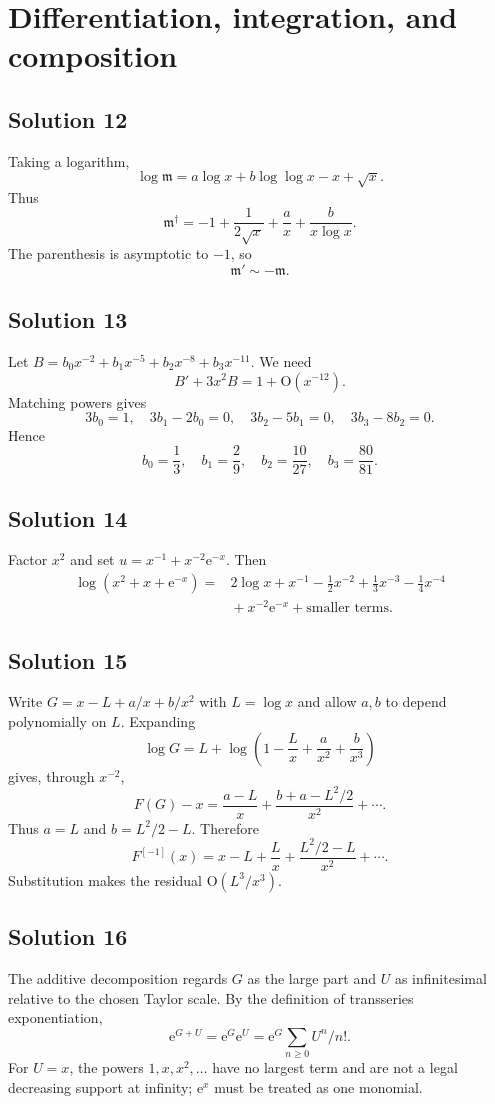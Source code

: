 \documentclass[11pt,openany]{book}
\theoremstyle{plain}
\theoremstyle{definition}
\theoremstyle{remark}
\newcommand{\m}{\mathfrak{m}}
\newcommand{\bigO}{\mathrm{O}}
\newcommand{\e}{\mathrm{e}}
\begin{document}
\section{Differentiation, integration, and composition}

\subsection*{Solution 12}
Taking a logarithm,
\[
 \log\m=a\log x+b\log\log x-x+\sqrt{x}.
\]
Thus
\[
 \m^\dagger=-1+\frac1{2\sqrt{x}}
 +\frac ax+\frac{b}{x\log x}.
\]
The parenthesis is asymptotic to $-1$, so
\[
  \m'\sim-\m.
\]

\subsection*{Solution 13}
Let $B=b_0x^{-2}+b_1x^{-5}+b_2x^{-8}+b_3x^{-11}$. We need
\[
 B'+3x^2B=1+\bigO(x^{-12}).
\]
Matching powers gives
\[
 3b_0=1,
 \quad 3b_1-2b_0=0,
 \quad 3b_2-5b_1=0,
 \quad 3b_3-8b_2=0.
\]
Hence
\[
 b_0=\frac13,
 \quad b_1=\frac29,
 \quad b_2=\frac{10}{27},
 \quad b_3=\frac{80}{81}.
\]

\subsection*{Solution 14}
Factor $x^2$ and set $u=x^{-1}+x^{-2}\e^{-x}$. Then
\begin{align*}
 \log(x^2+x+\e^{-x})
 ={}&2\log x+x^{-1}-\frac12x^{-2}
 +\frac13x^{-3}-\frac14x^{-4}\\
 &{}+x^{-2}\e^{-x}+\text{smaller terms}.
\end{align*}

\subsection*{Solution 15}
Write $G=x-L+a/x+b/x^2$ with $L=\log x$ and allow $a,b$ to depend polynomially on $L$. Expanding
\[
 \log G=L+\log\left(1-\frac Lx+\frac a{x^2}+\frac b{x^3}\right)
\]
gives, through $x^{-2}$,
\[
 F(G)-x=\frac{a-L}{x}
 +\frac{b+a-L^2/2}{x^2}+\cdots.
\]
Thus $a=L$ and $b=L^2/2-L$. Therefore
\[
 F^{[-1]}(x)=x-L+\frac Lx
 +\frac{L^2/2-L}{x^2}+\cdots.
\]
Substitution makes the residual $\bigO(L^3/x^3)$.

\subsection*{Solution 16}
The additive decomposition regards $G$ as the large part and $U$ as infinitesimal relative to the chosen Taylor scale. By the definition of transseries exponentiation,
\[
 \e^{G+U}=\e^G\e^U
 =\e^G\sum_{n\ge0}U^n/n!.
\]
For $U=x$, the powers $1,x,x^2,\ldots$ have no largest term and are not a legal decreasing support at infinity; $\e^x$ must be treated as one monomial.
\end{document}
